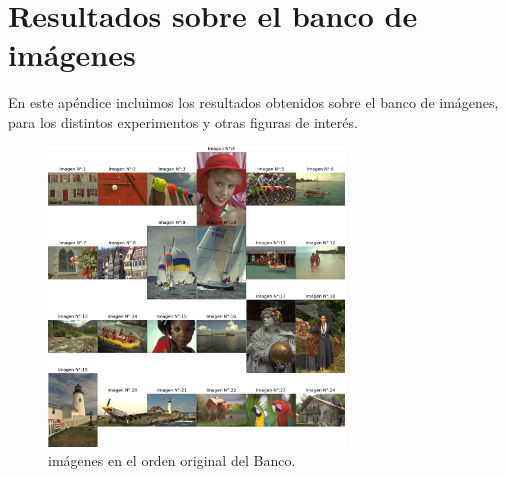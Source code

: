 \chapter{Resultados sobre el banco de im\'agenes}\label{appA}

En este ap\'endice incluimos los resultados obtenidos sobre el banco de im\'agenes, para los distintos experimentos y otras figuras de inter\'es. 


\begin{figure}[H]
    \centering
    \includegraphics[width=0.7\textwidth]{figuras/all_images_in_order.png}
    \caption{im\'agenes en el orden original del Banco.}
\end{figure}


